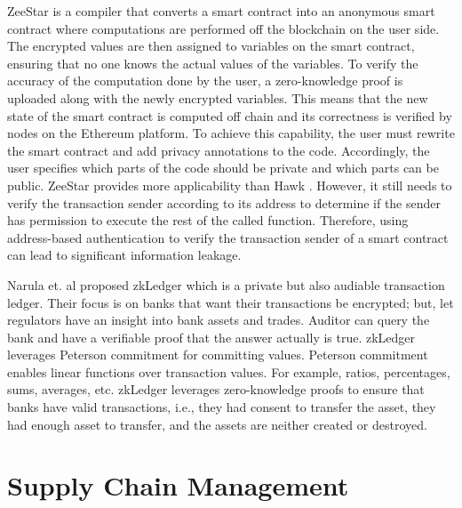ZeeStar \cite{ZeeStar} is a compiler that converts a smart contract into an anonymous smart contract where computations are performed off the blockchain on the user side. The encrypted values are then assigned to variables on the smart contract, ensuring that no one knows the actual values of the variables. To verify the accuracy of the computation done by the user, a zero-knowledge proof is uploaded along with the newly encrypted variables. This means that the new state of the smart contract is computed off chain and its correctness is verified by nodes on the Ethereum platform. To achieve this capability, the user must rewrite the smart contract and add privacy annotations to the code. Accordingly, the user specifies which parts of the code should be private and which parts can be public. 
ZeeStar \cite{ZeeStar} provides more applicability than Hawk \cite{Hawk}. However, it still needs to verify the transaction sender according to its address to determine if the sender has permission to execute the rest of the called function. Therefore, using address-based authentication to verify the transaction sender of a smart contract can lead to significant information leakage. 

Narula et. al \cite{zkLedger2018} proposed zkLedger which is a private but also audiable transaction ledger. Their focus is on banks that want their transactions be encrypted; but, let regulators have an insight into bank assets and trades. Auditor can query the bank and have a verifiable proof that the answer actually is true. zkLedger leverages Peterson commitment \cite{petersen1997convert} for committing values. Peterson commitment enables linear functions over transaction values. For example, ratios, percentages, sums, averages, etc. zkLedger leverages zero-knowledge proofs to ensure that banks have valid transactions, i.e., they had consent to transfer the asset, they had enough asset to transfer, and the assets are neither created or destroyed.

\section{Supply Chain Management}

